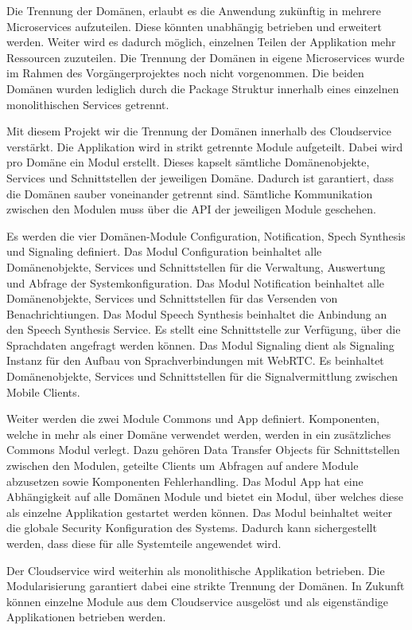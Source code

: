 Die Trennung der Domänen, erlaubt es die Anwendung zukünftig in mehrere Microservices aufzuteilen.
Diese könnten unabhängig betrieben und erweitert werden.
Weiter wird es dadurch möglich, einzelnen Teilen der Applikation mehr Ressourcen zuzuteilen.
Die Trennung der Domänen in eigene Microservices wurde im Rahmen des Vorgängerprojektes noch nicht vorgenommen.
Die beiden Domänen wurden lediglich durch die Package Struktur innerhalb eines einzelnen monolithischen Services getrennt.

Mit diesem Projekt wir die Trennung der Domänen innerhalb des Cloudservice verstärkt.
Die Applikation wird in strikt getrennte Module aufgeteilt.
Dabei wird pro Domäne ein Modul erstellt.
Dieses kapselt sämtliche Domänenobjekte, Services und Schnittstellen der jeweiligen Domäne.
Dadurch ist garantiert, dass die Domänen sauber voneinander getrennt sind.
Sämtliche Kommunikation zwischen den Modulen muss über die API der jeweiligen Module geschehen.

Es werden die vier Domänen-Module Configuration, Notification, Spech Synthesis und Signaling definiert.
Das Modul Configuration beinhaltet alle Domänenobjekte, Services und Schnittstellen für die Verwaltung, Auswertung und Abfrage der Systemkonfiguration.
Das Modul Notification beinhaltet alle Domänenobjekte, Services und Schnittstellen für das Versenden von Benachrichtiungen.
Das Modul Speech Synthesis beinhaltet die Anbindung an den Speech Synthesis Service.
Es stellt eine Schnittstelle zur Verfügung, über die Sprachdaten angefragt werden können.
Das Modul Signaling dient als Signaling Instanz für den Aufbau von Sprachverbindungen mit WebRTC\@.
Es beinhaltet Domänenobjekte, Services und Schnittstellen für die Signalvermittlung zwischen Mobile Clients.

Weiter werden die zwei Module Commons und App definiert.
Komponenten, welche in mehr als einer Domäne verwendet werden, werden in ein zusätzliches Commons Modul verlegt.
Dazu gehören Data Transfer Objects für Schnittstellen zwischen den Modulen, geteilte Clients um Abfragen auf andere Module abzusetzen sowie Komponenten Fehlerhandling.
Das Modul App hat eine Abhängigkeit auf alle Domänen Module und bietet ein Modul, über welches diese als einzelne Applikation gestartet werden können.
Das Modul beinhaltet weiter die globale Security Konfiguration des Systems.
Dadurch kann sichergestellt werden, dass diese für alle Systemteile angewendet wird.

Der Cloudservice wird weiterhin als monolithische Applikation betrieben.
Die Modularisierung garantiert dabei eine strikte Trennung der Domänen.
In Zukunft können einzelne Module aus dem Cloudservice ausgelöst und als eigenständige Applikationen betrieben werden.

